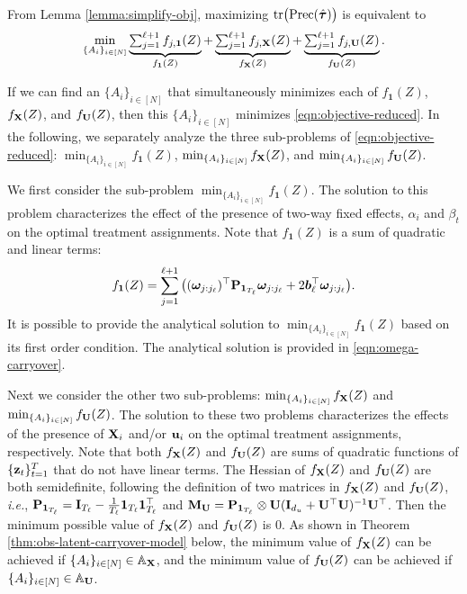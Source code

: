 {    
    From Lemma \ref{lemma:simplify-obj}, maximizing $	\mathrm{tr} \big(\mathrm{Prec}(\hat{\bm{\tau}})  \big)$ is equivalent to 
	\begin{equation}\label{eqn:objective-reduced}
	 \min_{\{A_i\}_{i \in [N]} }  \underbrace{\textstyle \sum_{j = 1}^{\ell+1}   f_{j,\bm{1}}(Z)  }_{f_{\bm{1}}(Z) }  + \underbrace{\textstyle \sum_{j = 1}^{\ell+1}   f_{j,\mathbf{X}}(Z) }_{f_{\mathbf{X}}(Z) }  + \underbrace{\textstyle \sum_{j = 1}^{\ell+1}   f_{j,\mathbf{U}}(Z)  }_{f_{\mathbf{U}}(Z) }. 
	\end{equation}

    If we can find an $\{A_i\}_{i \in [N]}$ that simultaneously minimizes each of $f_{\bm{1}}(Z)$, $f_{\mathbf{X}}(Z)$, and $f_{\mathbf{U}}(Z)$, then this $\{A_i\}_{i \in [N]}$ minimizes \eqref{eqn:objective-reduced}. In the following, we separately analyze the three sub-problems of \eqref{eqn:objective-reduced}: $\min_{\{A_i\}_{i \in [N]} }  f_{\bm{1}}(Z) $, $\min_{\{A_i\}_{i \in [N]} }  f_{\mathbf{X}}(Z) $, and $\min_{\{A_i\}_{i \in [N]} }  f_{\mathbf{U}}(Z) $.

	We first consider the sub-problem $\min_{\{A_i\}_{i \in [N]} }  f_{\bm{1}}(Z) $. The solution to this problem characterizes the effect of the presence of two-way fixed effects, $\alpha_i$ and $\beta_t$ on the optimal treatment assignments. Note that $f_{\bm{1}}(Z)$ is a sum of quadratic and linear terms:
	\begin{equation}\label{eqn:f1w-carryover-obj}
	   f_{\bm{1}}(Z) =\sum_{j = 1}^{\ell+1} \big( (\bm{\omega}_{j:j_\ell})^\top \mathbf{P}_{\bm{1}_{T_\ell}}  \bm{\omega}_{j:j_\ell}  + 2 \bm{b}_{\ell}^\top \bm{\omega}_{j:j_\ell} \big).
	\end{equation}
	It is possible to provide the analytical solution to $\min_{\{A_i\}_{i \in [N]} }  f_{\bm{1}}(Z) $ based on its first order condition. The analytical solution is provided in \eqref{eqn:omega-carryover}. 
	
	
	Next we consider the other two sub-problems: $\min_{\{A_i\}_{i \in [N]} }  f_{\mathbf{X}}(Z) $ and $\min_{\{A_i\}_{i \in [N]} }  f_{\mathbf{U}}(Z) $. The solution to these two problems characterizes the effects of the presence of $\mathbf{X}_i$ and/or $\mathbf{u}_i$ on the optimal treatment assignments, respectively. 
	Note that both $f_{\mathbf{X}}(Z) $ and $f_{\mathbf{U}}(Z) $ are sums of quadratic functions of $\{\mathbf{z}_t\}_{t=1}^T$ that do not have linear terms. The Hessian of $f_{\mathbf{X}}(Z) $ and $f_{\mathbf{U}}(Z) $ are both semidefinite, following the definition of two matrices in $f_{\mathbf{X}}(Z) $ and $f_{\mathbf{U}}(Z) $, {\it i.e.}, $\mathbf{P}_{\bm{1}_{T_\ell}} = \mathbf{I}_{T_\ell} - \frac{1}{T_\ell} \bm{1}_{T_\ell} \bm{1}_{T_\ell}^\top$ and $\mathbf{M}_{\mathbf{U}} = \mathbf{P}_{\bm{1}_{T_\ell}} \otimes \mathbf{U} (\mathbf{I}_{d_u} +  \mathbf{U}^\top \mathbf{U})^{-1} \mathbf{U}^\top$. Then the minimum possible value of $f_{\mathbf{X}}(Z) $ and $f_{\mathbf{U}}(Z) $ is 0. As shown in Theorem \ref{thm:obs-latent-carryover-model} below, the minimum value of $f_{\mathbf{X}}(Z) $ can be achieved if $\{A_i\}_{i \in [N]} \in \mathbb{A}_{\mathbf{X}}$, and the minimum value of $f_{\mathbf{U}}(Z)$ can be achieved if $\{A_i\}_{i \in [N]} \in \mathbb{A}_{\mathbf{U}}$.

}

\clearpage


